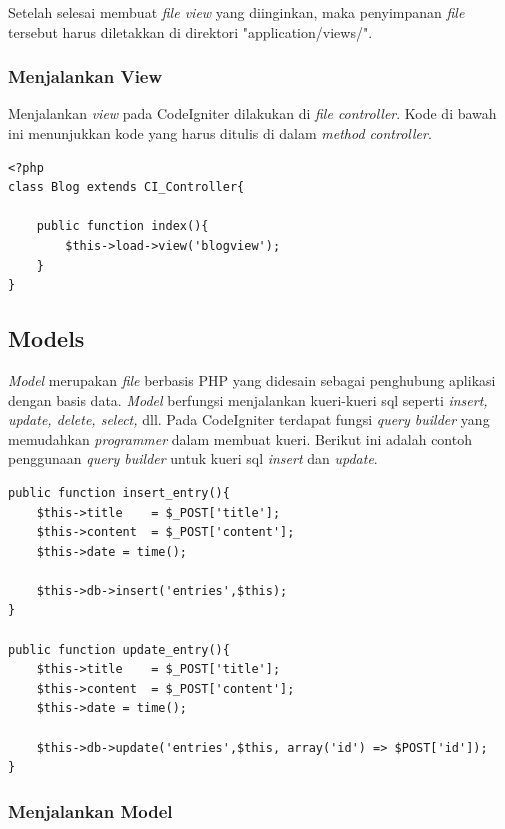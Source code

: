 	Setelah selesai membuat \textit{file view} yang diinginkan, maka penyimpanan \textit{file} tersebut harus diletakkan di direktori "application/views/".
	
	\subsubsection{Menjalankan View}
	\label{subsub: menjalankanView}
	
	Menjalankan \textit{view} pada CodeIgniter dilakukan di \textit{file controller}. Kode di bawah ini menunjukkan kode yang harus ditulis di dalam \textit{method controller}.
	
	\begin{lstlisting}
<?php
class Blog extends CI_Controller{
	
	public function index(){
		$this->load->view('blogview');
	}
}
	\end{lstlisting}
	
	\subsection{Models}
	\label{sub: models}
	
	\textit{Model} merupakan \textit{file} berbasis PHP yang didesain sebagai penghubung aplikasi dengan basis data. \textit{Model} berfungsi menjalankan kueri-kueri sql seperti \textit{insert, update, delete, select,} dll.
	Pada CodeIgniter terdapat fungsi \textit{query builder} yang memudahkan \textit{programmer} dalam membuat kueri. Berikut ini adalah contoh penggunaan \textit{query builder} untuk kueri sql \textit{insert} dan \textit{update}.
	
	\begin{lstlisting}
public function insert_entry(){
	$this->title	= $_POST['title'];
	$this->content	= $_POST['content'];
	$this->date	= time();
	
	$this->db->insert('entries',$this);
}

public function update_entry(){
	$this->title	= $_POST['title'];
	$this->content	= $_POST['content'];
	$this->date	= time();
	
	$this->db->update('entries',$this, array('id') => $POST['id']);
}
	\end{lstlisting}
	
	\subsubsection{Menjalankan Model}
	\label{subsub: menjalankanModel}
		
